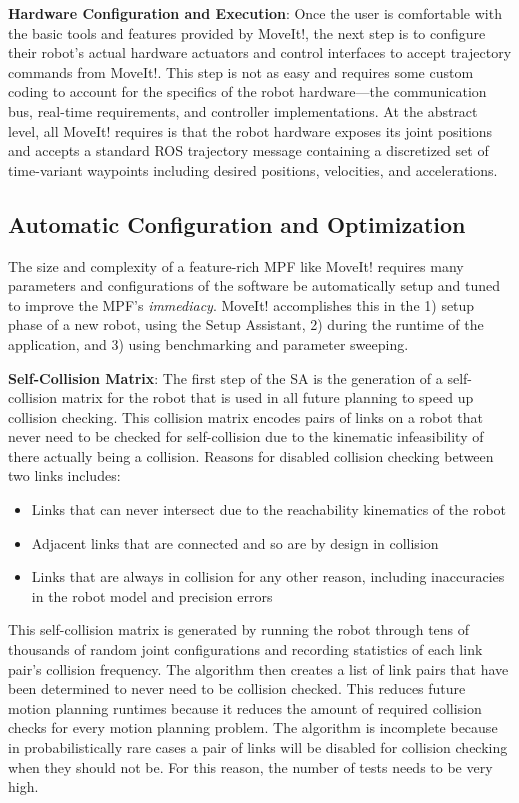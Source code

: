 \documentclass[10pt,journal,compsoc]{joser1}
\begin{document}
{{\bf Hardware Configuration and Execution}: Once the user is comfortable with
the basic tools and features provided by MoveIt!, the next step is to configure
their robot's actual hardware actuators and control interfaces to accept
trajectory commands from MoveIt!. This step is not as easy and requires some
custom coding to account for the specifics of the robot hardware---the
communication bus, real-time requirements, and controller implementations. At
the abstract level, all MoveIt! requires is that the robot hardware exposes its joint positions and accepts a
standard ROS trajectory message containing a discretized set of time-variant
waypoints including desired positions, velocities, and accelerations.  

\subsection{Automatic Configuration and Optimization}

The size and complexity of a feature-rich MPF like MoveIt! requires many
parameters and configurations of the software be automatically setup and tuned
to improve the MPF's \textit{immediacy}. MoveIt! accomplishes this in the 1)
setup phase of a new robot, using the Setup Assistant, 2) during the runtime of
the application, and 3) using benchmarking and parameter
sweeping\cite{cohen2012generic}.

{\bf Self-Collision Matrix}: The first step of the SA is the generation of a
self-collision matrix for the robot that is used in all future planning to speed
up collision checking. This collision matrix encodes pairs of links on a robot
that never need to be checked for self-collision due to the kinematic
infeasibility of there actually being a collision. Reasons for disabled
collision checking between two links includes:
\begin{itemize}
    \item Links that can never intersect due to the reachability kinematics of
the robot
    \item Adjacent links that are connected and so are by design in collision
    \item Links that are always in collision for any other reason, including
inaccuracies in the robot model and precision errors
\end{itemize}

This self-collision matrix is generated by running the robot through tens of
thousands of random joint configurations and recording statistics of each link
pair's collision frequency. The algorithm then creates a list of link pairs that
have been determined to never need to be collision checked. This reduces future
motion planning runtimes because it reduces the amount of required collision
checks for every motion planning problem. The algorithm is incomplete because in
probabilistically rare cases a pair of links will be disabled for collision
checking when they should not be. For this reason, the number of tests needs to
be very high.

}
\end{document}
